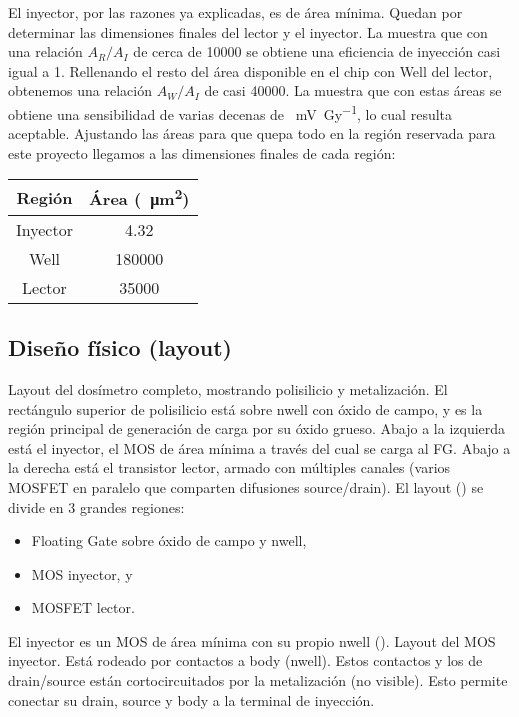 El inyector, por las razones ya explicadas, es de área mínima.
Quedan por determinar las dimensiones finales del lector y el inyector.
La 
muestra que con una relación $A_R/A_I$ de cerca de 10000
se obtiene una eficiencia de inyección casi igual a 1.
Rellenando el resto del área disponible en el chip con Well del lector,
obtenemos una relación $A_W/A_I$ de casi 40000.
La  muestra que con estas áreas
se obtiene una sensibilidad de varias decenas de \SI{}{\milli\volt\per\gray},
lo cual resulta aceptable.
Ajustando las áreas para que quepa todo 
en la región reservada para este proyecto 
llegamos a las dimensiones finales de cada región:
\begin{table}[h]
\centering
\begin{tabular}{|c|c|}
    \hline
    Región   & Área (\SI{}{\micro\meter\squared})\\ \hline
Inyector & 4.32\\
Well     & 180000\\
Lector   & 35000\\
\hline
\end{tabular}
\end{table}
%
\subsection{Diseño físico (layout)}
%
{Layout del dosímetro completo, mostrando polisilicio y metalización.
El rectángulo superior de polisilicio está sobre nwell con óxido de campo,
y es la región principal de generación de carga por su óxido grueso.
Abajo a la izquierda está el inyector, 
el MOS de área mínima a través del cual se carga al FG.
Abajo a la derecha está el transistor lector,
armado con múltiples canales 
(varios MOSFET en paralelo que comparten difusiones source/drain).}
El layout () se divide en 3 grandes regiones:
\begin{itemize}
    \item Floating Gate sobre óxido de campo y nwell,
    \item MOS inyector, y
    \item MOSFET lector.
\end{itemize}
El inyector es un MOS de área mínima con su propio nwell
().
{Layout del MOS inyector. Está rodeado por contactos a body (nwell).
Estos contactos y los de drain/source 
están cortocircuitados por la metalización (no visible).}
Esto permite conectar su drain, source y body a la terminal de inyección.

